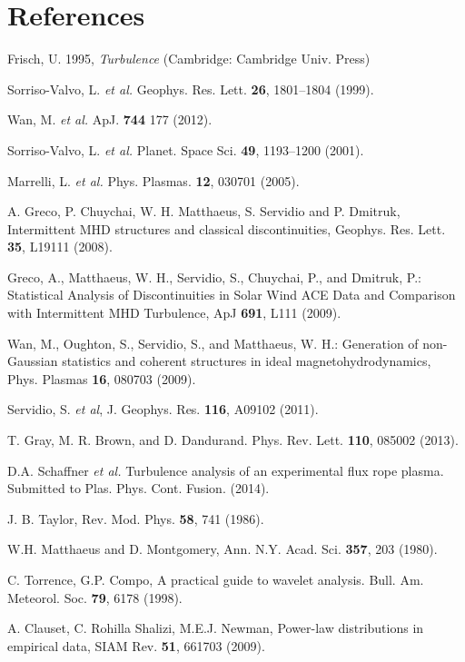 \documentclass[aip,prl,amsmath,amssymb,reprint,superscriptaddress]{revtex4-1} %
\begin{document}
\section*{References}
\begin{thebibliography}{21}

Frisch, U. 1995, {\it Turbulence} (Cambridge: Cambridge Univ. Press)

Sorriso-Valvo, L. {\it et al.} Geophys. Res. Lett. {\bf 26}, 1801–1804 (1999).

Wan, M. {\it et al.} ApJ. {\bf 744} 177 (2012).

Sorriso-Valvo, L. {\it et al.} Planet. Space Sci. {\bf 49}, 1193–1200 (2001).

Marrelli, L. {\it et al.} Phys. Plasmas. {\bf 12}, 030701 (2005).

A. Greco, P. Chuychai, W. H. Matthaeus, S. Servidio and P. Dmitruk, Intermittent MHD structures and classical discontinuities, Geophys. Res. Lett. {\bf 35}, L19111 (2008).

Greco, A., Matthaeus, W. H., Servidio, S., Chuychai, P., and Dmitruk, P.: Statistical Analysis of Discontinuities in Solar Wind ACE Data and Comparison with Intermittent MHD Turbulence, ApJ {\bf 691}, L111 (2009).

Wan, M., Oughton, S., Servidio, S., and Matthaeus, W. H.: Generation of non-Gaussian statistics and coherent structures in ideal magnetohydrodynamics, Phys. Plasmas {\bf 16}, 080703 (2009).

Servidio, S. {\it et al}, J. Geophys. Res. {\bf 116}, A09102 (2011).

 T. Gray, M. R. Brown, and D. Dandurand. Phys. Rev. Lett. {\bf 110}, 085002 (2013). 

 D.A. Schaffner {\it et al.} Turbulence analysis of an experimental flux rope plasma. Submitted to Plas. Phys. Cont. Fusion. (2014).

 J. B. Taylor, Rev. Mod. Phys. {\bf 58}, 741 (1986).

 W.H. Matthaeus and D. Montgomery, Ann. N.Y. Acad. Sci. {\bf 357}, 203 (1980).

C. Torrence, G.P. Compo, A practical guide to wavelet analysis. Bull. Am. Meteorol. Soc. {\bf 79}, 6178 (1998).

A. Clauset, C. Rohilla Shalizi, M.E.J. Newman, Power-law distributions in empirical data, SIAM Rev. {\bf 51}, 661703 (2009).


\end{thebibliography}
\end{document}

